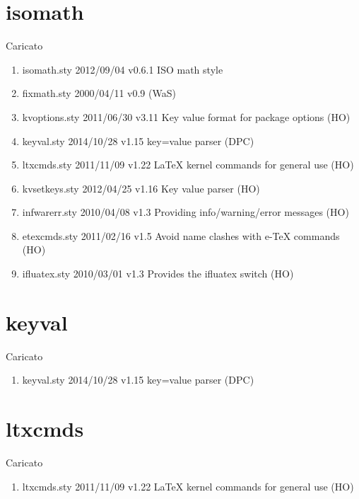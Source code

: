 \section{isomath}  

Caricato 
\begin{enumerate}
\item isomath.sty 2012/09/04 v0.6.1 ISO math style
\item fixmath.sty 2000/04/11 v0.9 (WaS)
\item kvoptions.sty 2011/06/30 v3.11 Key value format for package options (HO)
\item keyval.sty 2014/10/28 v1.15 key=value parser (DPC)
\item ltxcmds.sty 2011/11/09 v1.22 LaTeX kernel commands for general use (HO)
\item kvsetkeys.sty 2012/04/25 v1.16 Key value parser (HO)
\item infwarerr.sty 2010/04/08 v1.3 Providing info/warning/error messages (HO)
\item etexcmds.sty 2011/02/16 v1.5 Avoid name clashes with e-TeX commands (HO)
\item ifluatex.sty 2010/03/01 v1.3 Provides the ifluatex switch (HO)
\end{enumerate} 
\section{keyval}  

Caricato 
\begin{enumerate}
\item keyval.sty 2014/10/28 v1.15 key=value parser (DPC)
\end{enumerate}
\section{ltxcmds}  

Caricato 
\begin{enumerate}
\item ltxcmds.sty 2011/11/09 v1.22 LaTeX kernel commands for general use (HO)
\end{enumerate}
